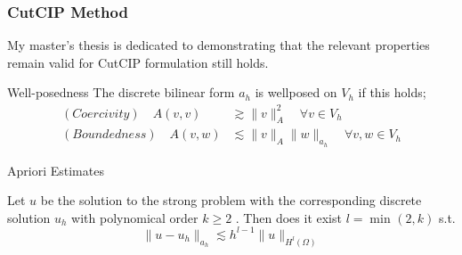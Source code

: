 \begin{frame}
\frametitle{ CutCIP Method}

My master's thesis is dedicated to demonstrating that the relevant properties remain valid for CutCIP formulation still holds.

    \begin{block}{Well-posedness }
         The discrete bilinear form $a_{h}$ is wellposed on $V_{h}$ if this holds; \[
             \begin{split}
                 (Coercivity) \quad  A( v,v) &  \gtrsim  \| v \|_{A }^{ 2 } \quad  \forall v \in  V_{h} \\
            (Boundedness) \quad A( v,w) & \lesssim  \| v \|_{A }^{  }\| w \|_{a_{h} }^{  } \quad  \forall v,w \in  V_{h}
             \end{split}
        \]
    \end{block}

    \begin{block}{Apriori Estimates }

         Let $u$ be the solution to the strong problem with the corresponding discrete solution $u_{h}$ with polynomical order $k\ge 2$ .
        Then does it exist  $l = \min_{} ( 2, k)  $ s.t.
\[
        \| u - u_{h} \|_{a_{h}  }^{  } \lesssim  h^{l-1} \| u \|_{ H^{l} ( \Omega ) }^{  }
\]
    \end{block}

\end{frame}




